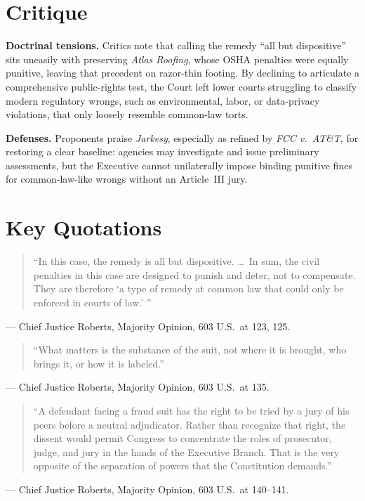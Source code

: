 \documentclass[12pt]{article}
\begin{document}
\section{Critique}

\textbf{Doctrinal tensions.} Critics note that calling the remedy ``all but dispositive'' sits uneasily with preserving \textit{Atlas Roofing}, whose OSHA penalties were equally punitive, leaving that precedent on razor-thin footing. By declining to articulate a comprehensive public-rights test, the Court left lower courts struggling to classify modern regulatory wrongs, such as environmental, labor, or data-privacy violations, that only loosely resemble common-law torts.

\textbf{Defenses.} Proponents praise \textit{Jarkesy}, especially as refined by \textit{FCC v.\ AT\&T}, for restoring a clear baseline: agencies may investigate and issue preliminary assessments, but the Executive cannot unilaterally impose binding punitive fines for common-law-like wrongs without an Article~III jury.

\section{Key Quotations}

\begin{quote}
``In this case, the remedy is all but dispositive. \ldots\ In sum, the civil penalties in this case are designed to punish and deter, not to compensate. They are therefore `a type of remedy at common law that could only be enforced in courts of law.' ''
\end{quote}
\noindent --- Chief Justice Roberts, Majority Opinion, 603 U.S.\ at 123, 125.

\begin{quote}
``What matters is the substance of the suit, not where it is brought, who brings it, or how it is labeled.''
\end{quote}
\noindent --- Chief Justice Roberts, Majority Opinion, 603 U.S.\ at 135.

\begin{quote}
``A defendant facing a fraud suit has the right to be tried by a jury of his peers before a neutral adjudicator. Rather than recognize that right, the dissent would permit Congress to concentrate the roles of prosecutor, judge, and jury in the hands of the Executive Branch. That is the very opposite of the separation of powers that the Constitution demands.''
\end{quote}
\noindent --- Chief Justice Roberts, Majority Opinion, 603 U.S.\ at 140--141.
\end{document}
